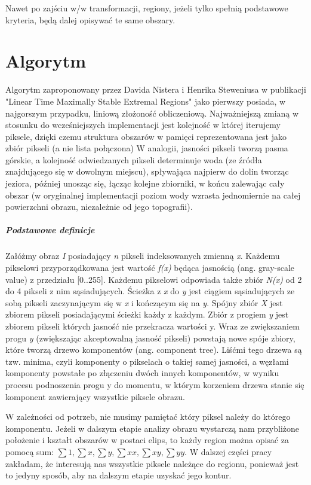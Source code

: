 Nawet po zajściu w/w transformacji, regiony, jeżeli tylko spełnią podstawowe
kryteria, będą dalej opisywać te same obszary.

\section{Algorytm}

Algorytm zaproponowany przez Davida Nistera i Henrika Steweniusa w publikacji
"Linear Time Maximally Stable Extremal Regions" \cite{Nister_Stewenius_2008}
jako pierwszy posiada, w najgorszym przypadku, liniową złożoność obliczeniową.
Najważniejszą zmianą w stosunku do wcześniejszych implementacji jest kolejność
w której iterujemy piksele, dzięki czemu struktura obszarów w pamięci
reprezentowana jest jako zbiór pikseli (a nie lista połączona) W analogii,
jasności pikseli tworzą pasma górskie, a kolejność odwiedzanych pikseli
determinuje woda (ze źródła znajdującego się w dowolnym miejscu), spływająca
najpierw do dolin tworząc jeziora, później unosząc się, łącząc kolejne
zbiorniki, w końcu zalewając cały obszar (w oryginalnej implementacji poziom
wody wzrasta jednomiernie na całej powierzchni obrazu, niezależnie od jego
topografii).

\subparagraph{Podstawowe definicje}

Załóżmy obraz \textit{I} posiadający \textit{n} pikseli indeksowanych zmienną
\textit{x}. Każdemu pikselowi przyporządkowana jest wartość \textit{f(x)}
będąca jasnością (ang. gray-scale value) z przedziału [0..255]. Każdemu
pikselowi odpowiada także zbiór \textit{N(x)} od 2 do 4 pikseli z nim
sąsiadujących. Ścieżka z \textit{x} do \textit{y} jest ciągiem sąsiadujących ze
sobą pikseli zaczynającym się w \textit{x} i kończącym się na \textit{y}.
Spójny zbiór \textit{X} jest zbiorem pikseli posiadającymi ścieżki każdy z
każdym. Zbiór z progiem \textit{y} jest zbiorem pikseli których jasność nie
przekracza wartości y. Wraz ze zwiększaniem progu \textit{y} (zwiększając
akceptowalną jasność pikseli) powstają nowe spóje zbiory, które tworzą drzewo
komponentów (ang. component tree). Liśćmi tego drzewa są tzw. minima, czyli
komponenty o pikselach o takiej samej jasności, a węzłami komponenty powstałe
po złączeniu dwóch innych komponentów, w wyniku procesu podnoszenia progu y do
momentu, w którym korzeniem drzewa stanie się komponent zawierający wszystkie
piksele obrazu.

W zależności od potrzeb, nie musimy pamiętać który piksel należy do którego
komponentu. Jeżeli w dalszym etapie analizy obrazu wystarczą nam przybliżone
położenie i kształt obszarów w postaci elips, to każdy region można opisać za
pomocą sum: $\sum{1}, \sum{x}, \sum{y}, \sum{xx}, \sum{xy}, \sum{yy}$. W
dalszej części pracy zakładam, że interesują nas wszystkie piksele należące do
regionu, ponieważ jest to jedyny sposób, aby na dalszym etapie uzyskać jego
kontur.

